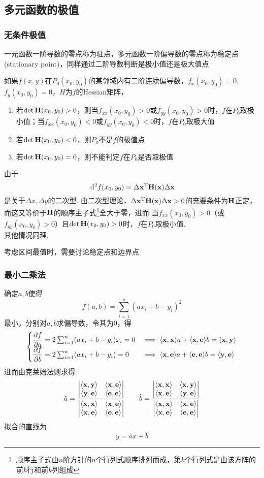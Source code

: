 
\subsection{多元函数的极值}
\subsubsection{无条件极值}
一元函数一阶导数的零点称为驻点，多元函数一阶偏导数的零点称为稳定点(stationary point)，同样通过二阶导数判断是极小值还是极大值点
\begin{theorem}
如果$f(x,y)$在$P_0(x_0,y_0)$的某邻域内有二阶连续偏导数，$f_x(x_0,y_0)=0$, $f_y(x_0,y_0)=0$，$H$为$f$的Hessian矩阵，
\begin{enumerate}
	\item 若$\det \mathbf{H}(x_0,y_0)>0$，则当$f_{xx}(x_0,y_0)>0$或$f_{yy}(x_0,y_0)>0$时，$f$在$P_0$取极小值；当$f_{xx}(x_0,y_0)<0$或$f_{yy}(x_0,y_0)<0$时，$f$在$P_0$取极大值
	\item 若$\det \mathbf{H}(x_0,y_0)<0$，则$P_0$不是$f$的极值点
	\item 若$\det \mathbf{H}(x_0,y_0)=0$，则不能判定$f$在$P_0$是否取极值
\end{enumerate}
\end{theorem}
\begin{analysis}
由于
\[\,\mathrm{d}^2 f(x_0,y_0)=\Delta\mathbf{x}^{\mathrm{T}}\mathbf{H}(\mathbf{x})\Delta\mathbf{x}\]
是关于$\Delta x,\Delta y$的二次型.
由二次型理论，$\Delta\mathbf{x}^{\mathrm{T}}\mathbf{H}(\mathbf{x})\Delta\mathbf{x}>0$的充要条件为$\mathbf{H}$正定，而这又等价于$\mathbf{H}$的顺序主子式\footnote{顺序主子式由$n$阶方针的$n$个行列式顺序排列而成，第$k$个行列式是由该方阵的前$k$行和前$k$列组成}全大于零，进而
当$f_{xx}(x_0,y_0)>0$（或$f_{yy}(x_0,y_0)>0$）且$\det \mathbf{H}(x_0,y_0)>0$时，$f$在$P_0$取极小值.\\
其他情况同理.
\end{analysis}
考虑区间最值时，需要讨论稳定点和边界点

\subsubsection{最小二乘法}
确定$a,b$使得
\[f(a,b)=\sum_{i=1}^n(ax_i+b-y_i)^2\]
最小，分别对$a,b$求偏导数，令其为$0$，得
\[\begin{cases}
\dfrac{\partial f}{\partial a}=2\sum_{i=1}^n(ax_i+b-y_i)x_i=0 & \implies\langle \mathbf{x},\mathbf{x} \rangle a+\langle \mathbf{x},\mathbf{e} \rangle b=\langle \mathbf{x},\mathbf{y} \rangle\\
\dfrac{\partial f}{\partial b}=2\sum_{i=1}^n(ax_i+b-y_i)=0 & \implies\langle \mathbf{x},\mathbf{e} \rangle a+\langle \mathbf{e},\mathbf{e} \rangle b=\langle \mathbf{y},\mathbf{e} \rangle
\end{cases}\]
进而由克莱姆法则求得
\[\hat{a}=\frac{\begin{vmatrix}\langle \mathbf{x},\mathbf{y} \rangle & \langle \mathbf{x},\mathbf{e} \rangle\\\langle \mathbf{y},\mathbf{e} \rangle&\langle \mathbf{e},\mathbf{e} \rangle\end{vmatrix}}
{\begin{vmatrix}\langle \mathbf{x},\mathbf{x} \rangle & \langle \mathbf{x},\mathbf{e} \rangle\\\langle \mathbf{x},\mathbf{e} \rangle&\langle \mathbf{e},\mathbf{e} \rangle\end{vmatrix}}
\qquad
\hat{b}=\frac{\begin{vmatrix}\langle \mathbf{x},\mathbf{x} \rangle & \langle \mathbf{x},\mathbf{y} \rangle\\\langle \mathbf{x},\mathbf{e} \rangle&\langle \mathbf{y},\mathbf{e} \rangle\end{vmatrix}}
{\begin{vmatrix}\langle \mathbf{x},\mathbf{x} \rangle & \langle \mathbf{x},\mathbf{e} \rangle\\\langle \mathbf{x},\mathbf{e} \rangle&\langle \mathbf{e},\mathbf{e} \rangle\end{vmatrix}}\]
拟合的直线为
\[y=\hat{a}x+\hat{b}\]

